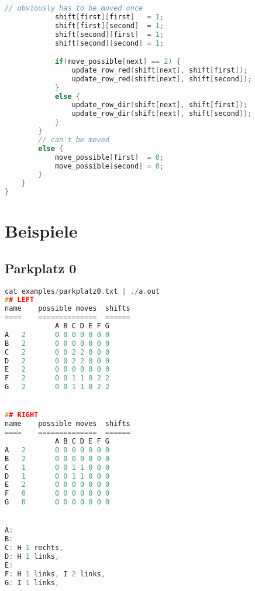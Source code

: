 \documentclass[a4paper,10pt,ngerman]{scrartcl}
\begin{document}
\begin{lstlisting}[language=C++]
            // obviously has to be moved once
            shift[first][first]   = 1;
            shift[first][second]  = 1;
            shift[second][first]  = 1;
            shift[second][second] = 1;

            if(move_possible[next] == 2) {
                update_row_red(shift[next], shift[first]);
                update_row_red(shift[next], shift[second]);
            }
            else {
                update_row_dir(shift[next], shift[first]);
                update_row_dir(shift[next], shift[second]);
            }
        }
        // can't be moved
        else {
            move_possible[first]  = 0;
            move_possible[second] = 0;
        }
    }
}
\end{lstlisting}

\section{Beispiele}
\subsection*{Parkplatz 0}
\begin{lstlisting}[language=C++]
cat examples/parkplatz0.txt | ./a.out
## LEFT
name	possible moves	shifts
====	==============	======
			A B C D E F G
A	2		0 0 0 0 0 0 0
B	2		0 0 0 0 0 0 0
C	2		0 0 2 2 0 0 0
D	2		0 0 2 2 0 0 0
E	2		0 0 0 0 0 0 0
F	2		0 0 1 1 0 2 2
G	2		0 0 1 1 0 2 2


## RIGHT
name	possible moves	shifts
====	==============	======
			A B C D E F G
A	2		0 0 0 0 0 0 0
B	2		0 0 0 0 0 0 0
C	1		0 0 1 1 0 0 0
D	1		0 0 1 1 0 0 0
E	2		0 0 0 0 0 0 0
F	0		0 0 0 0 0 0 0
G	0		0 0 0 0 0 0 0


A:
B:
C: H 1 rechts,
D: H 1 links,
E:
F: H 1 links, I 2 links,
G: I 1 links,
\end{lstlisting}
\end{document}
